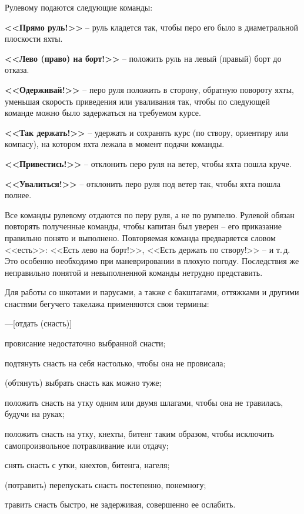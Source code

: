 \documentclass[a4paper, 12pt, twoside, final]{scrbook}
\begin{document}
Рулевому подаются следующие команды:

\textbf{<<Прямо руль!>>} \--- руль кладется так, чтобы перо его было в диаметральной плоскости яхты.

\textbf{<<Лево (право) на борт!>>} \--- положить руль на левый (правый) борт до отказа.

\textbf{<<Одерживай!>>} \--- перо руля положить в сторону, обратную повороту яхты, уменьшая скорость приведения или уваливания так, чтобы по следующей команде можно было задержаться на требуемом курсе.

\textbf{<<Так держать!>>} \--- удержать и сохранять курс (по створу, ориентиру или компасу), на котором яхта лежала в момент подачи команды.

\textbf{<<Привестись!>>} \--- отклонить перо руля на ветер, чтобы яхта пошла круче.

\textbf{<<Увалиться!>>} \--- отклонить перо руля под ветер так, чтобы яхта пошла полнее.

Все команды рулевому отдаются по перу руля, а не по румпелю. Рулевой обязан повторять полученные команды, чтобы капитан был уверен \--- его приказание правильно понято и выполнено. Повторяемая команда предваряется словом <<есть>>: <<Есть лево на борт!>>, <<Есть держать по створу!>> \--- и т.\,д. Это особенно необходимо при маневрировании в плохую погоду. Последствия же неправильно понятой и невыполненной команды нетрудно представить.

Для работы со шкотами и парусами, а также с бакштагами, оттяжками и другими снастями бегучего такелажа применяются свои термины:

\begin{desclist}{\bfseries}{ \hfill---}[отдать (снасть)]
\item[слабина] провисание недостаточно выбранной снасти;
\item[выбрать] подтянуть снасть на себя настолько, чтобы она не провисала;
\item[выбрать (снасть) втугую] (обтянуть) выбрать снасть как можно туже;
\item[заложить] положить снасть на утку одним или двумя шлагами, чтобы она не травилась, будучи на руках;
\item[закрепить] положить снасть на утку, кнехты, битенг таким образом, чтобы исключить самопроизвольное потравливание или отдачу;
\item[отдать (снасть)] снять снасть с утки, кнехтов, битенга, нагеля;
\item[травить] (потравить) перепускать снасть постепенно, понемногу;
\item[раздернуть] травить снасть быстро, не задерживая, совершенно ее ослабить.
\end{desclist}
\end{document}
